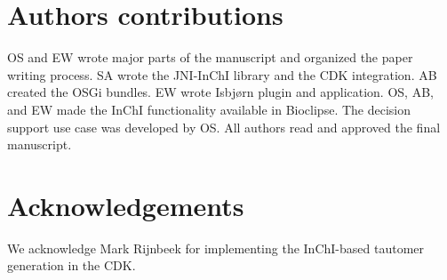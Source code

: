 \documentclass[10pt]{bmc_article}
\newenvironment{bmcformat}{\fussy\setboolean{publ}{true}}{\fussy}
\begin{document}
\begin{bmcformat}


    
\section*{Authors contributions}
OS and EW wrote major parts of the manuscript and organized the paper writing process. SA wrote the JNI-InChI library and
the CDK integration. AB created the OSGi bundles. EW wrote Isbjørn plugin and application. OS, AB, and EW made the InChI
functionality available in Bioclipse. The decision support use case was developed by OS.
All authors read and approved the final manuscript.
    

\section*{Acknowledgements}
We acknowledge Mark Rijnbeek for implementing the InChI-based tautomer
generation in the CDK.

 


{
   }     %


\end{bmcformat}
\end{document}

